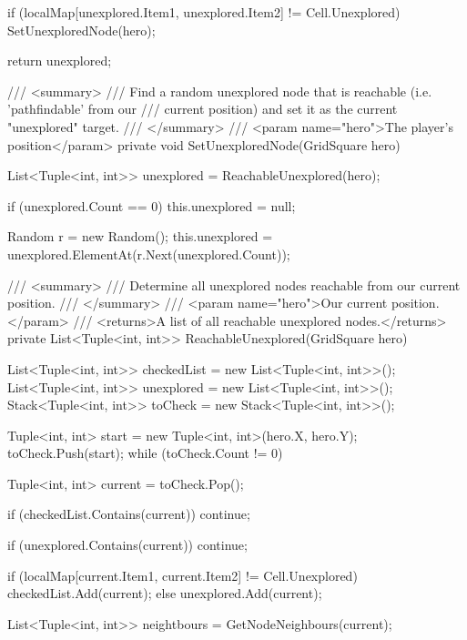\documentclass[11pt]{article}
\begin{document}
\begin{code}
{{{            if (localMap[unexplored.Item1, unexplored.Item2] != Cell.Unexplored)
            {
                SetUnexploredNode(hero);
            }

            return unexplored;
        }

        /// <summary>
        /// Find a random unexplored node that is reachable (i.e. 'pathfindable' from our
        /// current position) and set it as the current "unexplored" target.
        /// </summary>
        /// <param name="hero">The player's position</param>
        private void SetUnexploredNode(GridSquare hero)
        {
            List<Tuple<int, int>> unexplored = ReachableUnexplored(hero);

            if (unexplored.Count == 0)
            {
                this.unexplored = null;
            }

            Random r = new Random();
            this.unexplored = unexplored.ElementAt(r.Next(unexplored.Count));
        }

        /// <summary>
        /// Determine all unexplored nodes reachable from our current position.
        /// </summary>
        /// <param name="hero">Our current position.</param>
        /// <returns>A list of all reachable unexplored nodes.</returns>
        private List<Tuple<int, int>> ReachableUnexplored(GridSquare hero)
        {
            List<Tuple<int, int>> checkedList = new List<Tuple<int, int>>();
            List<Tuple<int, int>> unexplored = new List<Tuple<int, int>>();
            Stack<Tuple<int, int>> toCheck = new Stack<Tuple<int, int>>();

            Tuple<int, int> start = new Tuple<int, int>(hero.X, hero.Y);
            toCheck.Push(start);
            while (toCheck.Count != 0)
            {
                Tuple<int, int> current = toCheck.Pop();

                if (checkedList.Contains(current))
                {
                    continue;
                }

                if (unexplored.Contains(current))
                {
                    continue;
                }

                if (localMap[current.Item1, current.Item2] != Cell.Unexplored)
                {
                    checkedList.Add(current);
                }
                else
                {
                    unexplored.Add(current);
                }

                List<Tuple<int, int>> neightbours = GetNodeNeighbours(current);

}}}}
\end{code}
\end{document}
